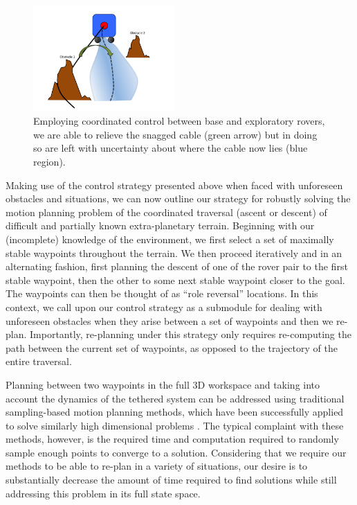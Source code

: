 \documentclass[12pt]{article}
\begin{document}
\begin{figure}
  \begin{center}
	\vspace{-0.4in}	
	\includegraphics[width=0.48\textwidth, left]{cable_uncertainty}
  \end{center}
  \vspace{-0.2in}
  \label{fig:cable}
  \caption{Employing coordinated control between base and exploratory rovers, we are able to relieve the snagged cable 
  (green arrow) but in doing so are left with uncertainty about where the cable now lies (blue region).}
\end{figure}
Making use of the control strategy presented above when faced with unforeseen obstacles and situations, 
we can now outline our strategy for robustly
solving the motion planning problem of the coordinated traversal (ascent or descent) of difficult and partially known 
extra-planetary terrain. Beginning with our (incomplete) knowledge of the environment, we first select a set of maximally stable waypoints 
throughout the terrain. We then proceed iteratively and in an alternating fashion, first planning the descent of one of the rover
pair to the first stable waypoint, 
then the other to some next stable waypoint closer to the goal. The waypoints can then be thought of as ``role reversal''
locations. In this context, we call upon our control strategy as a submodule for dealing with unforeseen obstacles when 
they arise between a set of waypoints and then we re-plan. Importantly, re-planning under this strategy only requires re-computing 
the path between the current set of waypoints, as opposed to the trajectory of the entire traversal. 

Planning between two waypoints in the full 3D workspace and taking into account the dynamics of the tethered system can be 
addressed using traditional sampling-based motion planning methods, which have been successfully applied to solve similarly 
high dimensional problems \cite{zak_kino}. The typical complaint with these methods, however, is the required time and 
computation required to randomly sample enough points to converge to a solution. Considering that we require our 
methods to be able to re-plan in a variety of situations, our desire is to substantially decrease the amount of time 
required to find solutions while still addressing this problem in its full state space. 
\end{document}
